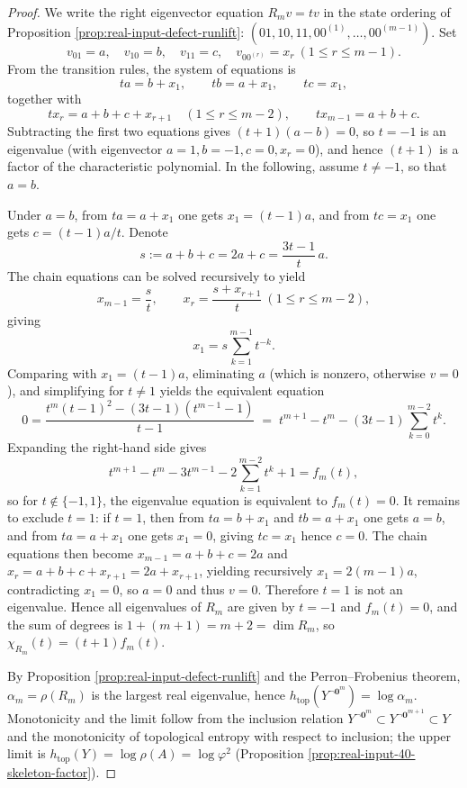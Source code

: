 \begin{proof}
We write the right eigenvector equation $R_m v=t v$ in the state ordering of Proposition \ref{prop:real-input-defect-runlift}:
\(
(01,10,11,00^{(1)},\dots,00^{(m-1)})
\).
Set
\[
v_{01}=a,\quad v_{10}=b,\quad v_{11}=c,\quad v_{00^{(r)}}=x_r\ (1\le r\le m-1).
\]
From the transition rules, the system of equations is
\[
ta=b+x_1,\qquad
tb=a+x_1,\qquad
tc=x_1,
\]
together with
\[
tx_r=a+b+c+x_{r+1}\quad(1\le r\le m-2),
\qquad
tx_{m-1}=a+b+c.
\]
Subtracting the first two equations gives
\(
(t+1)(a-b)=0
\), so $t=-1$ is an eigenvalue (with eigenvector $a=1,b=-1,c=0,x_r=0$), and hence $(t+1)$ is a factor of the characteristic polynomial.
In the following, assume $t\neq -1$, so that $a=b$.

Under $a=b$, from $ta=a+x_1$ one gets $x_1=(t-1)a$, and from $tc=x_1$ one gets $c=(t-1)a/t$.
Denote
\[
s:=a+b+c=2a+c=\frac{3t-1}{t}\,a.
\]
The chain equations can be solved recursively to yield
\[
x_{m-1}=\frac{s}{t},\qquad
x_r=\frac{s+x_{r+1}}{t}\ (1\le r\le m-2),
\]
giving
\[
x_1=s\sum_{k=1}^{m-1}t^{-k}.
\]
Comparing with $x_1=(t-1)a$, eliminating $a$ (which is nonzero, otherwise $v=0$), and simplifying for $t\neq 1$ yields the equivalent equation
\[
0=
\frac{t^m(t-1)^2-(3t-1)(t^{m-1}-1)}{t-1}
\;=\;
t^{m+1}-t^{m}-(3t-1)\sum_{k=0}^{m-2}t^k.
\]
Expanding the right-hand side gives
\[
t^{m+1}-t^{m}-3t^{m-1}-2\sum_{k=1}^{m-2}t^k+1
=f_m(t),
\]
so for $t\notin\{-1,1\}$, the eigenvalue equation is equivalent to $f_m(t)=0$.
It remains to exclude $t=1$: if $t=1$, then from $ta=b+x_1$ and $tb=a+x_1$ one gets $a=b$, and from $ta=a+x_1$ one gets $x_1=0$, giving $tc=x_1$ hence $c=0$.
The chain equations then become $x_{m-1}=a+b+c=2a$ and $x_r=a+b+c+x_{r+1}=2a+x_{r+1}$, yielding recursively $x_1=2(m-1)a$, contradicting $x_1=0$, so $a=0$ and thus $v=0$.
Therefore $t=1$ is not an eigenvalue.
Hence all eigenvalues of $R_m$ are given by $t=-1$ and $f_m(t)=0$, and the sum of degrees is $1+(m+1)=m+2=\dim R_m$, so
\(
\chi_{R_m}(t)=(t+1)f_m(t)
\).

By Proposition \ref{prop:real-input-defect-runlift} and the Perron--Frobenius theorem, $\alpha_m=\rho(R_m)$ is the largest real eigenvalue, hence
\(
h_{\mathrm{top}}(Y^{\neg \mathbf{0}^m})=\log\alpha_m
\).
Monotonicity and the limit follow from the inclusion relation
\(
Y^{\neg \mathbf{0}^m}\subset Y^{\neg \mathbf{0}^{m+1}}\subset Y
\)
and the monotonicity of topological entropy with respect to inclusion; the upper limit is $h_{\mathrm{top}}(Y)=\log\rho(A)=\log\varphi^2$ (Proposition \ref{prop:real-input-40-skeleton-factor}).
\end{proof}

